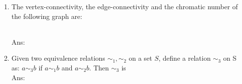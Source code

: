 \documentclass[10pt, letterpaper]{article}
\newcommand{\eat}[1]{}
\begin{document}
\begin{enumerate}


\item The vertex-connectivity, the edge-connectivity and the chromatic number of the following graph are:
\begin{figure*}[h]
\centering
\end{figure*}\\
Ans:



\item Given two equivalence relations $\sim_1, \sim_2$ on a set $S$, define a relation $\sim_3$ on S as: $a \sim_3 b$ if $a \sim_1 b$ and $a \sim_2 b$. Then $\sim_3$ is\\
Ans:

\begin{enumerate*}\item  1		
	
\item  3		
	
\item  2 		
	
\item  4		
	
\item  5 \eat{*}

\end{enumerate*}


\end{enumerate}
\end{document}
